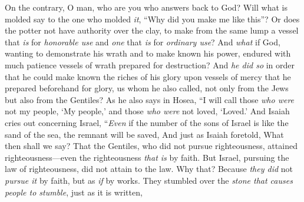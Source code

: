 \begin{biblechapter}
\verse On the contrary, O man, who are you who answers back to God? Will what is molded say to the one who molded \textit{it}, “Why did you make me like this”?
\verse Or does the potter not have authority over the clay, to make from the same lump a vessel that \textit{is} for \textit{honorable use} and \textit{one} that \textit{is} for \textit{ordinary use}?
\verse And \textit{what} if God, wanting to demonstrate his wrath and to make known his power, endured with much patience vessels of wrath prepared for destruction?
\verse And \textit{he did so} in order that he could make known the riches of his glory upon vessels of mercy that he prepared beforehand for glory,
\verse us whom he also called, not only from the Jews but also from the Gentiles?
\verse As he also says in Hosea,
\verse “I will call those \textit{who were} not my people, ‘My people,’ 
and those \textit{who were} not loved, ‘Loved.’
\verse And Isaiah cries out concerning Israel,
\verse “\textit{Even} if the number of the sons of Israel is like the sand of the sea, 
the remnant will be saved,
\verse And just as Isaiah foretold,
\verse What then shall we say? That the Gentiles, who did not pursue righteousness, attained righteousness—even the righteousness \textit{that is} by faith.
\verse But Israel, pursuing the law of righteousness, did not attain to the law.
\verse Why that? Because \textit{they did} not \textit{pursue it} by faith, but as \textit{if} by works. They stumbled over the \textit{stone that causes people to stumble},
\verse just as it is written,
\end{biblechapter}

